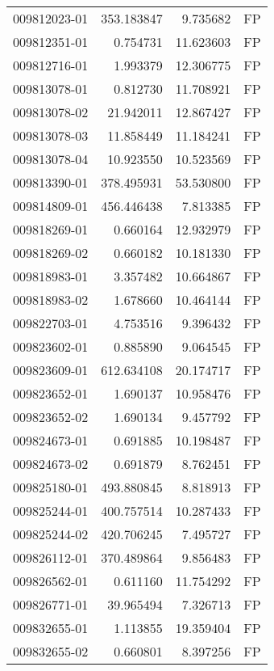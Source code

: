 \begin{tabular}{lrrl}
009812023-01 &  353.183847 &       9.735682 &   FP \\
009812351-01 &    0.754731 &      11.623603 &   FP \\
009812716-01 &    1.993379 &      12.306775 &   FP \\
009813078-01 &    0.812730 &      11.708921 &   FP \\
009813078-02 &   21.942011 &      12.867427 &   FP \\
009813078-03 &   11.858449 &      11.184241 &   FP \\
009813078-04 &   10.923550 &      10.523569 &   FP \\
009813390-01 &  378.495931 &      53.530800 &   FP \\
009814809-01 &  456.446438 &       7.813385 &   FP \\
009818269-01 &    0.660164 &      12.932979 &   FP \\
009818269-02 &    0.660182 &      10.181330 &   FP \\
009818983-01 &    3.357482 &      10.664867 &   FP \\
009818983-02 &    1.678660 &      10.464144 &   FP \\
009822703-01 &    4.753516 &       9.396432 &   FP \\
009823602-01 &    0.885890 &       9.064545 &   FP \\
009823609-01 &  612.634108 &      20.174717 &   FP \\
009823652-01 &    1.690137 &      10.958476 &   FP \\
009823652-02 &    1.690134 &       9.457792 &   FP \\
009824673-01 &    0.691885 &      10.198487 &   FP \\
009824673-02 &    0.691879 &       8.762451 &   FP \\
009825180-01 &  493.880845 &       8.818913 &   FP \\
009825244-01 &  400.757514 &      10.287433 &   FP \\
009825244-02 &  420.706245 &       7.495727 &   FP \\
009826112-01 &  370.489864 &       9.856483 &   FP \\
009826562-01 &    0.611160 &      11.754292 &   FP \\
009826771-01 &   39.965494 &       7.326713 &   FP \\
009832655-01 &    1.113855 &      19.359404 &   FP \\
009832655-02 &    0.660801 &       8.397256 &   FP \\

\end{tabular}
